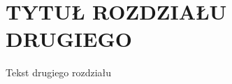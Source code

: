 \chapter{TYTUŁ ROZDZIAŁU  DRUGIEGO}

{\markboth{}{}
\setlength{\parskip}{1.2ex plus 0.5ex minus 0.2ex}
\baselineskip 0.6cm

Tekst drugiego rozdziału\\

\lipsum[1-2] %

}